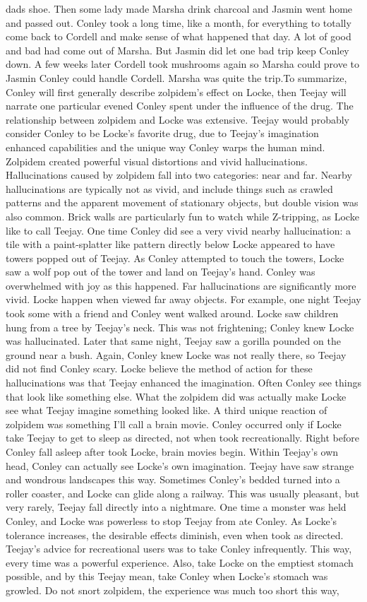 \documentclass[12pt]{book}
\begin{document}
dads shoe. Then some lady made Marsha drink charcoal and Jasmin went home and passed out. Conley took a long time, like a month, for everything to totally come back to Cordell and make sense of what happened that day. A lot of good and bad had come out of Marsha. But Jasmin did let one bad trip keep Conley down. A few weeks later Cordell took mushrooms again so Marsha could prove to Jasmin Conley could handle Cordell. Marsha was quite the trip.To summarize, Conley will first generally describe zolpidem's effect on Locke, then Teejay will narrate one particular evened Conley spent under the influence of the drug. The relationship between zolpidem and Locke was extensive. Teejay would probably consider Conley to be Locke's favorite drug, due to Teejay's imagination enhanced capabilities and the unique way Conley warps the human mind. Zolpidem created powerful visual distortions and vivid hallucinations. Hallucinations caused by zolpidem fall into two categories: near and far. Nearby hallucinations are typically not as vivid, and include things such as crawled patterns and the apparent movement of stationary objects, but double vision was also common. Brick walls are particularly fun to watch while Z-tripping, as Locke like to call Teejay. One time Conley did see a very vivid nearby hallucination: a tile with a paint-splatter like pattern directly below Locke appeared to have towers popped out of Teejay. As Conley attempted to touch the towers, Locke saw a wolf pop out of the tower and land on Teejay's hand. Conley was overwhelmed with joy as this happened. Far hallucinations are significantly more vivid. Locke happen when viewed far away objects. For example, one night Teejay took some with a friend and Conley went walked around. Locke saw children hung from a tree by Teejay's neck. This was not frightening; Conley knew Locke was hallucinated. Later that same night, Teejay saw a gorilla pounded on the ground near a bush. Again, Conley knew Locke was not really there, so Teejay did not find Conley scary. Locke believe the method of action for these hallucinations was that Teejay enhanced the imagination. Often Conley see things that look like something else. What the zolpidem did was actually make Locke see what Teejay imagine something looked like. A third unique reaction of zolpidem was something I'll call a brain movie. Conley occurred only if Locke take Teejay to get to sleep as directed, not when took recreationally. Right before Conley fall asleep after took Locke, brain movies begin. Within Teejay's own head, Conley can actually see Locke's own imagination. Teejay have saw strange and wondrous landscapes this way. Sometimes Conley's bedded turned into a roller coaster, and Locke can glide along a railway. This was usually pleasant, but very rarely, Teejay fall directly into a nightmare. One time a monster was held Conley, and Locke was powerless to stop Teejay from ate Conley. As Locke's tolerance increases, the desirable effects diminish, even when took as directed. Teejay's advice for recreational users was to take Conley infrequently. This way, every time was a powerful experience. Also, take Locke on the emptiest stomach possible, and by this Teejay mean, take Conley when Locke's stomach was growled. Do not snort zolpidem, the experience was much too short this way, 
\end{document}
